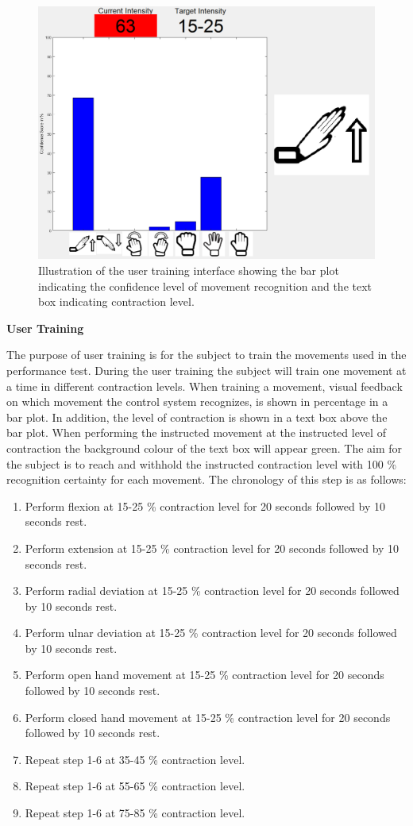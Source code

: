 \begin{figure}[H]                 
	\includegraphics[width=.4\textwidth]{figures/xBackground/usertraintestGUI}  
	\caption{Illustration of the user training interface showing the bar plot indicating the confidence level of movement recognition and the text box indicating contraction level.}
	\label{fig:usertraintestGUI} 
\end{figure}

\textbf{User Training} %

The purpose of user training is for the subject to train the movements used in the performance test. During the user training the subject will train one movement at a time in different contraction levels. When training a movement, visual feedback on which movement the control system recognizes, is shown in percentage in a bar plot. In addition, the level of contraction is shown in a text box above the bar plot. When performing the instructed movement at the instructed level of contraction the background colour of the text box will appear green. The aim for the subject is to reach and withhold the instructed contraction level with 100 \% recognition certainty for each movement. The chronology of this step is as follows:

\begin{enumerate}
	\item Perform flexion at 15-25 \% contraction level for 20 seconds followed by 10 seconds rest.
	\item Perform extension at 15-25 \% contraction level for 20 seconds followed by 10 seconds rest.
	\item Perform radial deviation at 15-25 \% contraction level for 20 seconds followed by 10 seconds rest.
	\item Perform ulnar deviation at 15-25 \% contraction level for 20 seconds followed by 10 seconds rest.
	\item Perform open hand movement at 15-25 \% contraction level for 20 seconds followed by 10 seconds rest.
	\item Perform closed hand movement at 15-25 \% contraction level for 20 seconds followed by 10 seconds rest.
	\item Repeat step 1-6 at 35-45 \% contraction level.
	\item Repeat step 1-6 at 55-65 \% contraction level.
	\item Repeat step 1-6 at 75-85 \% contraction level.
\end{enumerate} 

